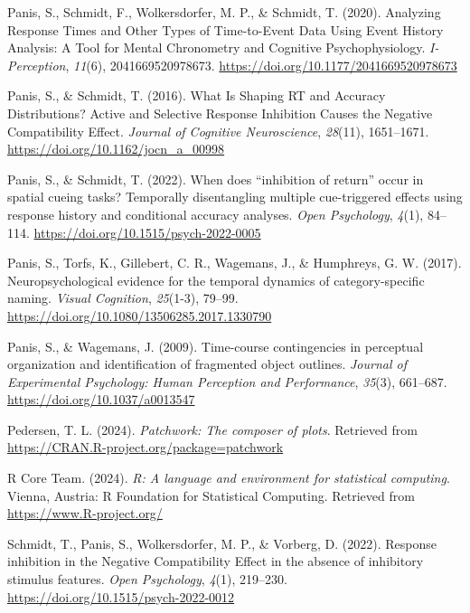 \documentclass[
  man,floatsintext]{apa6}
\newlength{\cslhangindent}
\newenvironment{CSLReferences}[2] %
 {\begin{list}{}{%
  \setlength{\itemindent}{0pt}
  \setlength{\leftmargin}{0pt}
  \setlength{\parsep}{0pt}
  \ifodd #1
   \setlength{\leftmargin}{\cslhangindent}
   \setlength{\itemindent}{-1\cslhangindent}
  \fi
  \setlength{\itemsep}{#2\baselineskip}}}
 {\end{list}}
\begin{document}
\begin{CSLReferences}{1}{0}
Panis, S., Schmidt, F., Wolkersdorfer, M. P., \& Schmidt, T. (2020). Analyzing {Response Times} and {Other Types} of {Time-to-Event Data Using Event History Analysis}: {A Tool} for {Mental Chronometry} and {Cognitive Psychophysiology}. \emph{I-Perception}, \emph{11}(6), 2041669520978673. \url{https://doi.org/10.1177/2041669520978673}

Panis, S., \& Schmidt, T. (2016). What {Is Shaping RT} and {Accuracy Distributions}? {Active} and {Selective Response Inhibition Causes} the {Negative Compatibility Effect}. \emph{Journal of Cognitive Neuroscience}, \emph{28}(11), 1651--1671. \url{https://doi.org/10.1162/jocn_a_00998}

Panis, S., \& Schmidt, T. (2022). When does {``inhibition of return''} occur in spatial cueing tasks? {Temporally} disentangling multiple cue-triggered effects using response history and conditional accuracy analyses. \emph{Open Psychology}, \emph{4}(1), 84--114. \url{https://doi.org/10.1515/psych-2022-0005}

Panis, S., Torfs, K., Gillebert, C. R., Wagemans, J., \& Humphreys, G. W. (2017). Neuropsychological evidence for the temporal dynamics of category-specific naming. \emph{Visual Cognition}, \emph{25}(1-3), 79--99. \url{https://doi.org/10.1080/13506285.2017.1330790}

Panis, S., \& Wagemans, J. (2009). Time-course contingencies in perceptual organization and identification of fragmented object outlines. \emph{Journal of Experimental Psychology: Human Perception and Performance}, \emph{35}(3), 661--687. \url{https://doi.org/10.1037/a0013547}

Pedersen, T. L. (2024). \emph{Patchwork: The composer of plots}. Retrieved from \url{https://CRAN.R-project.org/package=patchwork}

R Core Team. (2024). \emph{R: A language and environment for statistical computing}. Vienna, Austria: R Foundation for Statistical Computing. Retrieved from \url{https://www.R-project.org/}

Schmidt, T., Panis, S., Wolkersdorfer, M. P., \& Vorberg, D. (2022). Response inhibition in the {Negative Compatibility Effect} in the absence of inhibitory stimulus features. \emph{Open Psychology}, \emph{4}(1), 219--230. \url{https://doi.org/10.1515/psych-2022-0012}


\end{CSLReferences}
\end{document}
